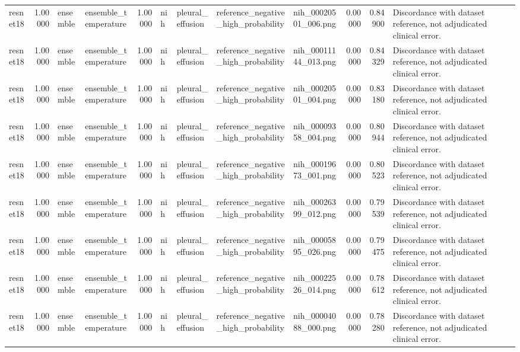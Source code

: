 \begin{tabular}{lrllrllllrrl}
resnet18 & 1.00000 & ensemble & ensemble\_temperature & 1.00000 & nih & pleural\_effusion & reference\_negative\_high\_probability & nih\_00020501\_006.png & 0.00000 & 0.84900 & Discordance with dataset reference, not adjudicated clinical error. \\
resnet18 & 1.00000 & ensemble & ensemble\_temperature & 1.00000 & nih & pleural\_effusion & reference\_negative\_high\_probability & nih\_00011144\_013.png & 0.00000 & 0.84329 & Discordance with dataset reference, not adjudicated clinical error. \\
resnet18 & 1.00000 & ensemble & ensemble\_temperature & 1.00000 & nih & pleural\_effusion & reference\_negative\_high\_probability & nih\_00020501\_004.png & 0.00000 & 0.83180 & Discordance with dataset reference, not adjudicated clinical error. \\
resnet18 & 1.00000 & ensemble & ensemble\_temperature & 1.00000 & nih & pleural\_effusion & reference\_negative\_high\_probability & nih\_00009358\_004.png & 0.00000 & 0.80944 & Discordance with dataset reference, not adjudicated clinical error. \\
resnet18 & 1.00000 & ensemble & ensemble\_temperature & 1.00000 & nih & pleural\_effusion & reference\_negative\_high\_probability & nih\_00019673\_001.png & 0.00000 & 0.80523 & Discordance with dataset reference, not adjudicated clinical error. \\
resnet18 & 1.00000 & ensemble & ensemble\_temperature & 1.00000 & nih & pleural\_effusion & reference\_negative\_high\_probability & nih\_00026399\_012.png & 0.00000 & 0.79539 & Discordance with dataset reference, not adjudicated clinical error. \\
resnet18 & 1.00000 & ensemble & ensemble\_temperature & 1.00000 & nih & pleural\_effusion & reference\_negative\_high\_probability & nih\_00005895\_026.png & 0.00000 & 0.79475 & Discordance with dataset reference, not adjudicated clinical error. \\
resnet18 & 1.00000 & ensemble & ensemble\_temperature & 1.00000 & nih & pleural\_effusion & reference\_negative\_high\_probability & nih\_00022526\_014.png & 0.00000 & 0.78612 & Discordance with dataset reference, not adjudicated clinical error. \\
resnet18 & 1.00000 & ensemble & ensemble\_temperature & 1.00000 & nih & pleural\_effusion & reference\_negative\_high\_probability & nih\_00004088\_000.png & 0.00000 & 0.78280 & Discordance with dataset reference, not adjudicated clinical error. \\

\end{tabular}
